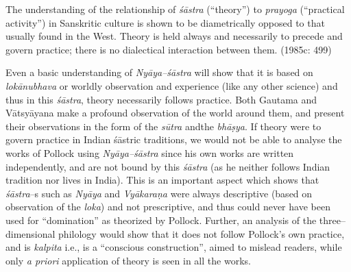 \begin{myquote}
The understanding of the relationship of \textit{śāstra} (“theory”) to \textit{prayoga} (“practical activity”) in Sanskritic culture is shown to be diametrically opposed to that usually found in the West. Theory is held always and necessarily to precede and govern practice; there is no dialectical interaction between them. (1985c: 499)
\end{myquote}

Even a basic understanding of \textit{Nyāya–śāstra} will show that it is based on \textit{lokānubhava} or worldly observation and experience (like any other science) and thus in this \textit{śāstra}, theory necessarily follows practice. Both Gautama and Vātsyāyana make a profound observation of the world around them, and present their observations in the form of the \textit{sūtra} andthe\textit{ bhāṣya}. If theory were to govern practice in Indian śāstric traditions, we would not be able to analyse the works of Pollock using \textit{Nyāya–śāstra} since his own works are written independently, and are not bound by this \textit{śāstra }(as he neither follows Indian tradition nor lives in India). This is an important aspect which shows that \textit{śāstra}–s such as \textit{Nyāya} and \textit{Vyākaraṇa} were always descriptive (based on observation of the \textit{loka}) and not prescriptive, and thus could never have been used for “domination” as theorized by Pollock. Further, an analysis of the three–dimensional philology would show that it does not follow Pollock’s own practice, and is \textit{kalpita} i.e., is a “conscious construction”, aimed to mislead readers, while only \textit{a priori} application of theory is seen in all the works.

